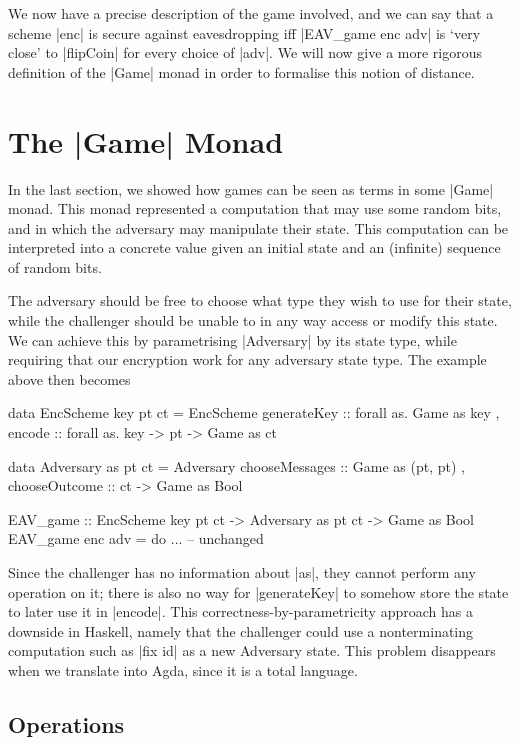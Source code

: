 We now have a precise description of the game involved, and we can say that a scheme |enc| is secure against
eavesdropping iff |EAV_game enc adv| is `very close' to |flipCoin| for every choice of |adv|.  We will now give a more
rigorous definition of the |Game| monad in order to formalise this notion of distance.

\section{The |Game| Monad}

In the last section, we showed how games can be seen as terms in some |Game| monad.  This monad represented a
computation that may use some random bits, and in which the adversary may manipulate their state.  This computation can
be interpreted into a concrete value given an initial state and an (infinite) sequence of random bits.

The adversary should be free to choose what type they wish to use for their state, while the challenger should be unable
to in any way access or modify this state.  We can achieve this by parametrising |Adversary| by its state type, while
requiring that our encryption work for any adversary state type.  The example above then becomes
\begin{code}
data EncScheme key pt ct = EncScheme
                         { generateKey :: forall as. Game as key
                         , encode :: forall as. key -> pt -> Game as ct
                         }

data Adversary as pt ct = Adversary
                        { chooseMessages :: Game as (pt, pt)
                        , chooseOutcome :: ct -> Game as Bool
                        }

EAV_game :: EncScheme key pt ct -> Adversary as pt ct -> Game as Bool
EAV_game enc adv = do
    ... -- unchanged
\end{code}

Since the challenger has no information about |as|, they cannot perform any operation on it; there is also no way for
|generateKey| to somehow store the state to later use it in |encode|.  This correctness-by-parametricity approach has a
downside in Haskell, namely that the challenger could use a nonterminating computation such as |fix id| as a new
Adversary state.  This problem disappears when we translate into Agda, since it is a total language.

\subsection{Operations}

